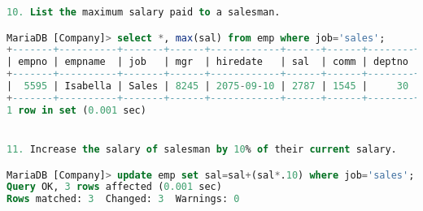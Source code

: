 \documentclass[11pt]{article}
\begin{document}
\begin{lstlisting}[language=SQL]
10. List the maximum salary paid to a salesman.

MariaDB [Company]> select *, max(sal) from emp where job='sales';
+-------+----------+-------+------+------------+------+------+--------+----------+
| empno | empname  | job   | mgr  | hiredate   | sal  | comm | deptno | max(sal) |
+-------+----------+-------+------+------------+------+------+--------+----------+
|  5595 | Isabella | Sales | 8245 | 2075-09-10 | 2787 | 1545 |     30 |    10287 |
+-------+----------+-------+------+------------+------+------+--------+----------+
1 row in set (0.001 sec)


11. Increase the salary of salesman by 10% of their current salary.

MariaDB [Company]> update emp set sal=sal+(sal*.10) where job='sales';
Query OK, 3 rows affected (0.001 sec)
Rows matched: 3  Changed: 3  Warnings: 0
	
\end{lstlisting}
\end{document}
